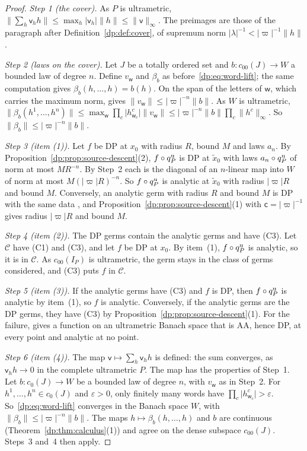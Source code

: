 \documentclass[11pt]{amsart}
\theoremstyle{definition}
\theoremstyle{remark}
\numberwithin{equation}{section}
\newcommand{\abs}[1]{\lvert #1\rvert}
\newcommand{\norm}[1]{\lVert #1\rVert}
\newcommand{\cC}{\mathcal{C}}
\theoremstyle{plain}
\theoremstyle{definition}
\theoremstyle{plain}
\begin{document}
\begin{proof}
\emph{Step 1 (the cover).} As $P$ is ultrametric, $\norm{\sum_h\mathsf v_hh}\le\max_h\abs{\mathsf v_h}\norm h\le\norm{\mathsf v}_\infty$. The preimages are those of the paragraph after Definition~\ref{dp:def:cover}, of supremum norm $\abs\lambda^{-1}<\abs\varpi^{-1}\norm h$.

\emph{Step 2 (laws on the cover).} Let $J$ be a totally ordered set and $b\colon c_{00}(J)\to W$ a bounded law of degree $n$. Define $v_{\mathsf w}$ and $\beta_b$ as before~\eqref{dp:eq:word-lift}; the same computation gives $\beta_b(h,\dots,h)=b(h)$. On the span of the letters of $\mathsf w$, which carries the maximum norm, \cite[Lemma~Q.2(4)]{I} gives $\norm{v_{\mathsf w}}\le\abs\varpi^{-n}\norm b$. As $W$ is ultrametric, $\norm{\beta_b(h^1,\dots,h^n)}\le\max_{\mathsf w}\prod_c\abs{h^c_{\mathsf w_c}}\norm{v_{\mathsf w}}\le\abs\varpi^{-n}\norm b\prod_c\norm{h^c}_\infty$. So $\norm{\beta_b}\le\abs\varpi^{-n}\norm b$.

\emph{Step 3 (item (1)).} Let $f$ be DP at $x_0$ with radius $R$, bound $M$ and laws $a_n$. By Proposition~\ref{dp:prop:source-descent}(2), $f\circ q^{\rm u}_P$ is DP at $\tilde x_0$ with laws $a_n\circ q^{\rm u}_P$ of norm at most $MR^{-n}$. By Step~2 each is the diagonal of an $n$-linear map into $W$ of norm at most $M(\abs\varpi R)^{-n}$. So $f\circ q^{\rm u}_P$ is analytic at $\tilde x_0$ with radius $\abs\varpi R$ and bound $M$. Conversely, an analytic germ with radius $R$ and bound $M$ is DP with the same data \cite[Proposition~14.9(1)]{I}, and Proposition~\ref{dp:prop:source-descent}(1) with $\mathsf c=\abs\varpi^{-1}$ gives radius $\abs\varpi R$ and bound $M$.

\emph{Step 4 (item (2)).} The DP germs contain the analytic germs and have (C3). Let $\cC$ have (C1) and (C3), and let $f$ be DP at $x_0$. By item~(1), $f\circ q^{\rm u}_P$ is analytic, so it is in $\cC$. As $c_{00}(I_P)$ is ultrametric, the germ stays in the class of germs considered, and (C3) puts $f$ in $\cC$.

\emph{Step 5 (item (3)).} If the analytic germs have (C3) and $f$ is DP, then $f\circ q^{\rm u}_P$ is analytic by item~(1), so $f$ is analytic. Conversely, if the analytic germs are the DP germs, they have (C3) by Proposition~\ref{dp:prop:source-descent}(1). For the failure, \cite[Proposition~14.40(3)]{I} gives a function on an ultrametric Banach space that is AA, hence DP, at every point and analytic at no point.

\emph{Step 6 (item (4)).} The map $\mathsf v\mapsto\sum_h\mathsf v_hh$ is defined: the sum converges, as $\mathsf v_hh\to0$ in the complete ultrametric $P$. The map has the properties of Step~1. Let $b\colon c_0(J)\to W$ be a bounded law of degree $n$, with $v_{\mathsf w}$ as in Step~2. For $h^1,\dots,h^n\in c_0(J)$ and $\varepsilon>0$, only finitely many words have $\prod_c\abs{h^c_{\mathsf w_c}}>\varepsilon$. So~\eqref{dp:eq:word-lift} converges in the Banach space $W$, with $\norm{\beta_b}\le\abs\varpi^{-n}\norm b$. The maps $h\mapsto\beta_b(h,\dots,h)$ and $b$ are continuous (Theorem~\ref{dp:thm:calculus}(1)) and agree on the dense subspace $c_{00}(J)$. Steps~3 and~4 then apply.
\end{proof}
\end{document}
